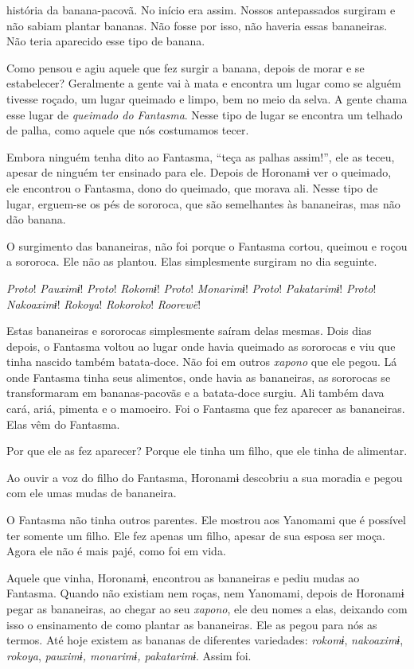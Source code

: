  história da banana-pacovã. No início era assim. Nossos antepassados
surgiram e não sabiam plantar bananas. Não fosse por isso, não haveria
essas bananeiras. Não teria aparecido esse tipo de banana.

Como pensou e agiu aquele que fez surgir a banana, depois de morar e se
estabelecer? Geralmente a gente vai à mata e encontra um lugar como se
alguém tivesse roçado, um lugar queimado e limpo, bem no meio da selva.
A gente chama esse lugar de \textit{queimado do Fantasma}. Nesse tipo de
lugar se encontra um telhado de palha, como aquele que nós costumamos
tecer. 

Embora ninguém tenha dito ao Fantasma, ``teça as palhas assim!'', ele as
 teceu, apesar de ninguém ter ensinado para ele. Depois de Horonamɨ ver o
 queimado, ele encontrou o Fantasma, dono do queimado, que morava ali.
 Nesse tipo de lugar, erguem-se os pés de sororoca, que são semelhantes
 às bananeiras, mas não dão banana. 

O surgimento das bananeiras, não foi porque o Fantasma cortou, queimou e
roçou a sororoca. Ele não as plantou. Elas simplesmente surgiram no dia
seguinte. 

\textit{Proto}! \textit{Pauximɨ}! \textit{Proto}! \textit{Rokomɨ}! \textit{Proto}! \textit{Monarimɨ}!
\textit{Proto}! \textit{Pakatarimɨ}!
\textit{Proto}! \textit{Nakoaximɨ}! \textit{Rokoya}! \textit{Rokoroko}! \textit{Roorewë}! 

Estas bananeiras e sororocas simplesmente saíram delas mesmas. Dois dias depois, o Fantasma voltou ao lugar onde havia queimado as sororocas e viu que tinha nascido
 também batata-doce. Não foi em outros \textit{xapono} que ele pegou. Lá onde
 Fantasma tinha seus alimentos, onde havia as bananeiras, as sororocas se
 transformaram em bananas-pacovãs e a batata-doce surgiu. Ali também dava
 cará, ariá, pimenta e o mamoeiro. Foi o Fantasma que fez aparecer as
 bananeiras. Elas vêm do Fantasma. 

Por que ele as fez aparecer? Porque ele tinha um filho, que ele tinha de
alimentar. 

Ao ouvir a voz do filho do Fantasma, Horonamɨ descobriu a sua moradia e
pegou com ele umas mudas de bananeira. 

O Fantasma não tinha outros parentes. Ele mostrou aos Yanomami que é
possível ter somente um filho. Ele fez apenas um filho, apesar de sua
esposa ser moça. Agora ele não é mais pajé, como foi em vida. 

Aquele que vinha, Horonamɨ, encontrou as bananeiras e pediu mudas ao
 Fantasma. Quando não existiam nem roças, nem Yanomami, depois de
 Horonamɨ pegar as bananeiras, ao chegar ao seu \textit{xapono}, ele deu nomes a
 elas, deixando com isso o ensinamento de como plantar as bananeiras. Ele
 as pegou para nós as termos. Até hoje existem as bananas de diferentes
 variedades: \textit{rokomɨ}, \textit{nakoaximɨ}, \textit{rokoya}, \textit{pauximɨ,
 monarimɨ, pakatarimɨ}. Assim foi. 

